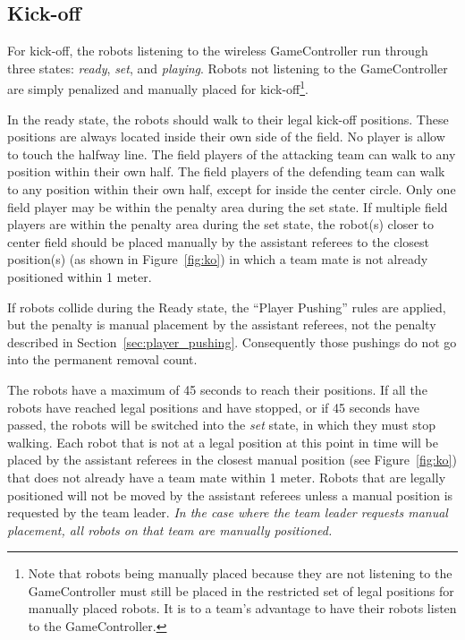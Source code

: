\documentclass[12pt]{article}
\newcommand{\KickOffAutoTime}{45 seconds\xspace}
\begin{document}
\subsection{Kick-off}
\label{sec:kick-off}
For kick-off, the robots listening to the wireless GameController run through three states: \emph{ready}, \emph{set}, and \emph{playing}. Robots not listening to the GameController are simply penalized and manually placed for kick-off\footnote{Note that robots being manually placed because they are not listening to the GameController must still be placed in the restricted set of legal positions for manually placed robots. It is to a team's advantage to have their robots listen to the GameController.}.

In the ready state, the robots should walk to their legal kick-off positions. These positions are always located inside their own side of the field. No player is allow to touch the halfway line.
The field players of the attacking team can walk to any position within their own half.
The field players of the defending team can walk to any position within their own half, except for inside the center circle.  Only one field player may be within the penalty area during the set state.  If multiple field players are within the penalty area during the set state, the robot(s) closer to center field should be placed manually by the assistant referees to the closest position(s) (as shown in Figure~\ref{fig:ko}) in which a team mate is not already positioned within 1 meter.

If robots collide during the Ready state, the ``Player Pushing'' rules are applied, but the penalty is manual placement by the assistant referees, not the penalty described in Section~\ref{sec:player_pushing}.
Consequently those pushings do not go into the permanent removal count.

The robots have a maximum of \KickOffAutoTime to reach their positions. If all the robots have reached legal positions and have stopped, or if \KickOffAutoTime have passed, the robots will be switched into the \emph{set} state, in which they must stop walking. Each robot that is not at a legal position at this point in time will be placed by the assistant referees in the closest manual position (see Figure~\ref{fig:ko}) that does not already have a team mate within 1 meter.
Robots that are legally positioned will not be moved by the assistant referees unless a manual position is requested by the team leader.
\emph{In the case where the team leader requests manual placement, all robots on that team are manually positioned.}
\end{document}
